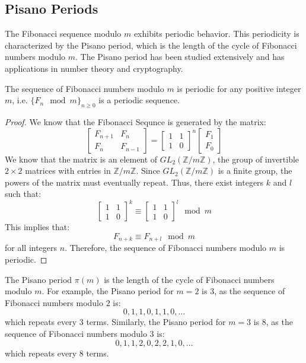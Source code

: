 \documentclass[openany]{book}
\begin{document}
\subsection{Pisano Periods}
The Fibonacci sequence modulo $m$ exhibits periodic behavior. This periodicity is characterized by the Pisano period, which is the length of the cycle of Fibonacci numbers modulo $m$. The Pisano period has been studied extensively and has applications in number theory and cryptography.
\begin{mytheorem}
    The sequence of Fibonacci numbers modulo $m$ is periodic for any positive integer $m$, i.e. $\{F_n \mod m\}_{n\geq 0}$ is a periodic sequence.
\end{mytheorem}
\begin{proof}
    We know that the Fibonacci Sequnce is generated by the matrix: 
    \[
    \begin{bmatrix}
    F_{n+1} & F_n \\
    F_n & F_{n-1}
    \end{bmatrix} = \begin{bmatrix}1 & 1 \\
    1 & 0
    \end{bmatrix}^n \begin{bmatrix}F_1 \\ F_0 \end{bmatrix}
    \]
    We know that the matrix is an element of $GL_2(\mathbb{Z}/m\mathbb{Z})$, the group of invertible $2\times 2$ matrices with entries in $\mathbb{Z}/m\mathbb{Z}$. Since $GL_2(\mathbb{Z}/m\mathbb{Z})$ is a finite group, the powers of the matrix must eventually repeat. Thus, there exist integers $k$ and $l$ such that:
    \[
        \begin{bmatrix}1 & 1 \\ 1 & 0 \end{bmatrix}^k \equiv \begin{bmatrix}1 & 1 \\ 1 & 0 \end{bmatrix}^l \mod m
    \]
    This implies that:
    \[
        F_{n+k} \equiv F_{n+l} \mod m
    \]
    for all integers $n$. Therefore, the sequence of Fibonacci numbers modulo $m$ is periodic.
\end{proof}
\begin{mynote}
    The Pisano period $\pi(m)$ is the length of the cycle of Fibonacci numbers modulo $m$. For example, the Pisano period for $m = 2$ is $3$, as the sequence of Fibonacci numbers modulo $2$ is:
    \[
        0, 1, 1, 0, 1, 1, 0, \ldots
    \]
    which repeats every $3$ terms. Similarly, the Pisano period for $m = 3$ is $8$, as the sequence of Fibonacci numbers modulo $3$ is:
    \[
        0, 1, 1, 2, 0, 2, 2, 1, 0, \ldots
    \]
    which repeats every $8$ terms.
\end{mynote}
\end{document}
